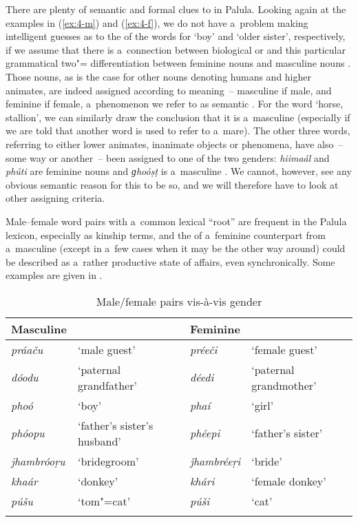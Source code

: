 There are plenty of semantic and formal clues to  in Palula. Looking again at the examples in (\ref{ex:4-m}) and (\ref{ex:4-f}), we do not have a~problem making intelligent guesses as to the  of the words for `boy' and `older sister', respectively, if we assume that there is a~connection between biological  or  and this particular grammatical two"= differentiation between feminine nouns and masculine nouns \citep[102]{dahl2000}. Those nouns, as is the case for other nouns denoting humans and higher animates, are indeed assigned  according to meaning~-- masculine  if male, and feminine if female, a~phenomenon we refer to as semantic  \citep[7--32]{corbett1991}. For the word `horse, stallion', we can similarly draw the conclusion that it is a~masculine  (especially if we are told that another word is used to refer to a~mare). The other three words, referring to either lower animates, inanimate objects or phenomena, have also~-- some way or another~-- been assigned to one of the two genders: \textit{hiimaál} and \textit{phúti} are feminine nouns and \textit{ɡhoóṣṭ} is a~masculine . We cannot, however, see any obvious semantic reason for this to be so, and we will therefore have to look at other assigning criteria.


Male--female word pairs with a~common lexical ``root'' are frequent in the Palula lexicon, especially as kinship terms, and the  of a~feminine counterpart from a~masculine (except in a~few cases when it may be the other way around) could be described as a~rather productive state of affairs, even synchronically. Some examples are given in .



\begin{table}[b]
\caption{Male/female pairs vis-à-vis gender}
\begin{tabularx}{\textwidth}{ l Q l Q }
\lsptoprule
Masculine &
&
Feminine &
\\\midrule
\textit{práaču} &
`male guest' &
\textit{préeči} &
`female guest'\\
\textit{dóodu} &
`paternal grandfather' &
\textit{déedi} &
`paternal grandmother'\\
\textit{phoó} &
`boy' &
\textit{phaí} &
`girl'\\
\textit{phóopu} &
`father's sister's husband' &
\textit{phéepi} &
`father's sister'\\
\textit{jhambróoṛu} &
`bridegroom' &
\textit{ǰhambréeṛi} &
`bride'\\
\textit{khaár} &
`donkey' &
\textit{khári} &
`female donkey'\\
\textit{púšu} &
`tom"=cat' &
\textit{púši} &
`cat'\\\lspbottomrule
\end{tabularx}
\label{tab:4-1}
\end{table}


